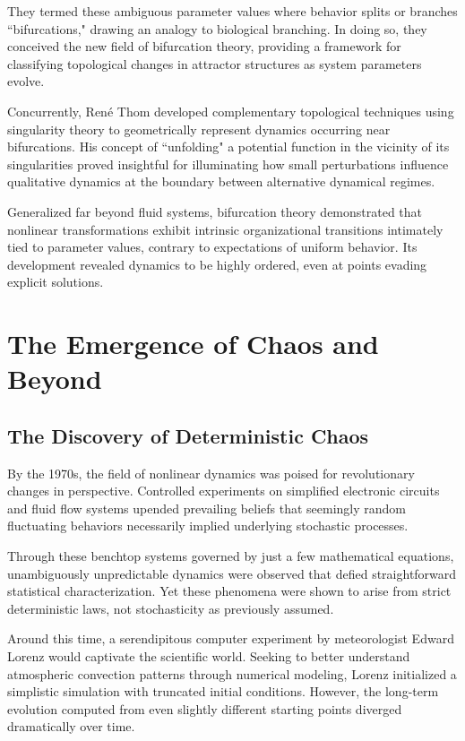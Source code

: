 They termed these ambiguous parameter values where behavior splits or branches ``bifurcations," drawing an analogy to biological branching. In doing so, they conceived the new field of bifurcation theory, providing a framework for classifying topological changes in attractor structures as system parameters evolve.

Concurrently, René Thom developed complementary topological techniques using singularity theory to geometrically represent dynamics occurring near bifurcations. His concept of ``unfolding" a potential function in the vicinity of its singularities proved insightful for illuminating how small perturbations influence qualitative dynamics at the boundary between alternative dynamical regimes.

Generalized far beyond fluid systems, bifurcation theory demonstrated that nonlinear transformations exhibit intrinsic organizational transitions intimately tied to parameter values, contrary to expectations of uniform behavior. Its development revealed dynamics to be highly ordered, even at points evading explicit solutions.

\section{The Emergence of Chaos and Beyond}

\subsection{The Discovery of Deterministic Chaos}

By the 1970s, the field of nonlinear dynamics was poised for revolutionary changes in perspective. Controlled experiments on simplified electronic circuits and fluid flow systems upended prevailing beliefs that seemingly random fluctuating behaviors necessarily implied underlying stochastic processes.

Through these benchtop systems governed by just a few mathematical equations, unambiguously unpredictable dynamics were observed that defied straightforward statistical characterization. Yet these phenomena were shown to arise from strict deterministic laws, not stochasticity as previously assumed.

Around this time, a serendipitous computer experiment by meteorologist Edward Lorenz would captivate the scientific world. Seeking to better understand atmospheric convection patterns through numerical modeling, Lorenz initialized a simplistic simulation with truncated initial conditions. However, the long-term evolution computed from even slightly different starting points diverged dramatically over time.

